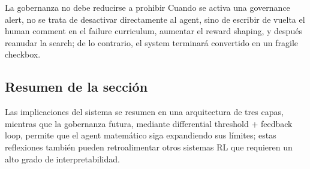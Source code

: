 \begin{warningbox}{La gobernanza no debe reducirse a prohibir}
Cuando se activa una governance alert, no se trata de desactivar directamente al agent, sino de escribir de vuelta el human comment en el failure curriculum, aumentar el reward shaping, y después reanudar la search; de lo contrario, el system terminará convertido en un fragile checkbox.
\end{warningbox}

\subsection{Resumen de la sección}
Las implicaciones del sistema se resumen en una arquitectura de tres capas, mientras que la gobernanza futura, mediante differential threshold + feedback loop, permite que el agent matemático siga expandiendo sus límites; estas reflexiones también pueden retroalimentar otros sistemas RL que requieren un alto grado de interpretabilidad.
\newpage


